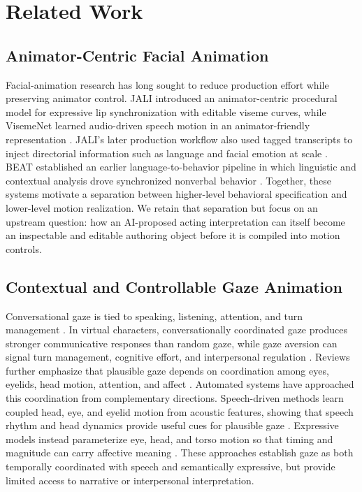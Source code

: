 \section{Related Work}

\subsection{Animator-Centric Facial Animation}

Facial-animation research has long sought to reduce production effort while preserving animator control. JALI introduced an animator-centric procedural model for expressive lip synchronization with editable viseme curves, while VisemeNet learned audio-driven speech motion in an animator-friendly representation \cite{edwards2016jali,zhou2018visemenet}. JALI's later production workflow also used tagged transcripts to inject directorial information such as language and facial emotion at scale \cite{edwards2020jali}. BEAT established an earlier language-to-behavior pipeline in which linguistic and contextual analysis drove synchronized nonverbal behavior \cite{cassell2001beat}. Together, these systems motivate a separation between higher-level behavioral specification and lower-level motion realization. We retain that separation but focus on an upstream question: how an AI-proposed acting interpretation can itself become an inspectable and editable authoring object before it is compiled into motion controls.

\subsection{Contextual and Controllable Gaze Animation}

Conversational gaze is tied to speaking, listening, attention, and turn management \cite{kendon1967gaze,vertegaal2001gaze}. In virtual characters, conversationally coordinated gaze produces stronger communicative responses than random gaze, while gaze aversion can signal turn management, cognitive effort, and interpersonal regulation \cite{garau2001impact,andrist2013gaze}. Reviews further emphasize that plausible gaze depends on coordination among eyes, eyelids, head motion, attention, and affect \cite{ruhland2014look}. Automated systems have approached this coordination from complementary directions. Speech-driven methods learn coupled head, eye, and eyelid motion from acoustic features, showing that speech rhythm and head dynamics provide useful cues for plausible gaze \cite{le2012live}. Expressive models instead parameterize eye, head, and torso motion so that timing and magnitude can carry affective meaning \cite{lance2010expressive}. These approaches establish gaze as both temporally coordinated with speech and semantically expressive, but provide limited access to narrative or interpersonal interpretation.

